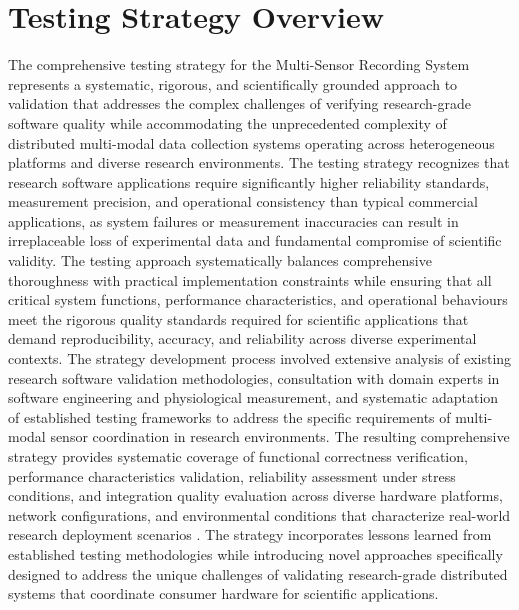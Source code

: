 \documentclass[11pt,a4paper]{report}
\begin{document}
\section{Testing Strategy Overview}
The comprehensive testing strategy for the Multi-Sensor Recording System represents a systematic, rigorous, and scientifically grounded approach to validation that addresses the complex challenges of verifying research-grade software quality while accommodating the unprecedented complexity of distributed multi-modal data collection systems operating across heterogeneous platforms and diverse research environments. The testing strategy recognizes that research software applications require significantly higher reliability standards, measurement precision, and operational consistency than typical commercial applications, as system failures or measurement inaccuracies can result in irreplaceable loss of experimental data and fundamental compromise of scientific validity.
The testing approach systematically balances comprehensive thoroughness with practical implementation constraints while ensuring that all critical system functions, performance characteristics, and operational behaviours meet the rigorous quality standards required for scientific applications that demand reproducibility, accuracy, and reliability across diverse experimental contexts. The strategy development process involved extensive analysis of existing research software validation methodologies, consultation with domain experts in software engineering and physiological measurement, and systematic adaptation of established testing frameworks to address the specific requirements of multi-modal sensor coordination in research environments.
The resulting comprehensive strategy provides systematic coverage of functional correctness verification, performance characteristics validation, reliability assessment under stress conditions, and integration quality evaluation across diverse hardware platforms, network configurations, and environmental conditions that characterize real-world research deployment scenarios \cite{Basili1987}. The strategy incorporates lessons learned from established testing methodologies while introducing novel approaches specifically designed to address the unique challenges of validating research-grade distributed systems that coordinate consumer hardware for scientific applications.
\end{document}
